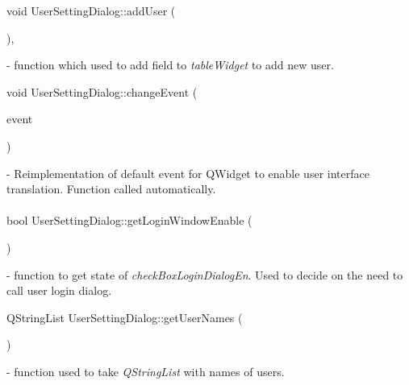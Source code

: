 \mbox{\label{classUserSettingDialog_a699172ed3d826f47823a5c7b2ee01cba}} 
{\footnotesize\ttfamily void User\+Setting\+Dialog\+::\texorpdfstring{add\+User}{addUser} (\begin{DoxyParamCaption}{ }\end{DoxyParamCaption})\hspace{0.3cm}{\ttfamily [private]}, {\ttfamily [slot]}} - function which used to add field to \textit{tableWidget} to add new user.

\mbox{\label{classUserSettingDialog_ad3b91400bb71ef025235bd9bee2551ac}} 
{\footnotesize\ttfamily void User\+Setting\+Dialog\+::\texorpdfstring{change\+Event}{changeEvent} (\begin{DoxyParamCaption}\item[{Q\+Event $\ast$}]{event }\end{DoxyParamCaption})\hspace{0.3cm}{\ttfamily [protected]}} - Reimplementation of default event for QWidget to enable user interface translation. Function called automatically.

\mbox{\label{classUserSettingDialog_a168420a490436fdb3a3b101b7e4e9fe3}} 
\paragraph{}
{\footnotesize\ttfamily bool User\+Setting\+Dialog\+::\texorpdfstring{get\+Login\+Window\+Enable}{getLoginWindowEnable} (\begin{DoxyParamCaption}{ }\end{DoxyParamCaption})} - function to get state of \textit{checkBoxLoginDialogEn}. Used to decide on the need to call user login dialog.

\mbox{\label{classUserSettingDialog_a96352f86848e37e60ef1b47c410ea676}} 
{\footnotesize\ttfamily Q\+String\+List User\+Setting\+Dialog\+::\texorpdfstring{get\+User\+Names}{getUserNames} (\begin{DoxyParamCaption}{ }\end{DoxyParamCaption})} - function used to take \textit{QStringList} with names of users.

